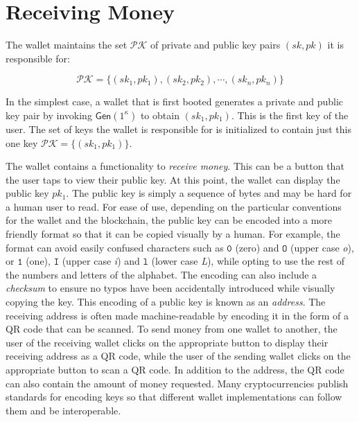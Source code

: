\section{Receiving Money}

The wallet maintains the set $\mathcal{PK}$ of private and public key
pairs $(sk, pk)$ it is responsible for:

\[
  \mathcal{PK} = \{ (sk_1, pk_1), (sk_2, pk_2), \cdots, (sk_n, pk_n) \}
\]

In the simplest case, a wallet that is first booted generates a private and public key pair
by invoking $\textsf{Gen}(1^\kappa)$ to obtain $(sk_1, pk_1)$. This is the first key of the user.
The set of keys the wallet is responsible for is initialized to contain just this one key
$\mathcal{PK} = \{ (sk_1, pk_1) \}$.

The wallet contains a functionality to \emph{receive money}. This can be a button that the user
taps to view their public key. At this point, the wallet can display the public key $pk_1$.
The public key is simply a sequence of bytes and may be hard for a human user to read.
For ease of use, depending on the particular conventions for the wallet and the blockchain,
the public key can be encoded into a more friendly format so that it can be copied visually
by a human. For example, the format can avoid easily confused characters such as $\texttt{0}$ (zero)
and $\texttt{O}$ (upper case \emph{o}), or $\texttt{1}$ (one), $\texttt{I}$ (upper case \emph{i}) and
$\texttt{l}$ (lower case \emph{L}), while opting to use the rest of the numbers and letters of the
alphabet.
The encoding can also include a \emph{checksum} to ensure no typos have been accidentally introduced
while visually copying
the key. This encoding of a public key is known as an \emph{address}. The receiving address
is often made machine-readable by encoding it in the form of a QR code that can be scanned.
To send money from one wallet to another, the user of the receiving wallet clicks on the appropriate
button to display their receiving address as a QR code,
while the user of the sending wallet clicks on the appropriate
button to scan a QR code. In addition to the address, the QR code can also contain the amount
of money requested.
Many cryptocurrencies publish standards for encoding keys so that different wallet implementations
can follow them and be interoperable.

